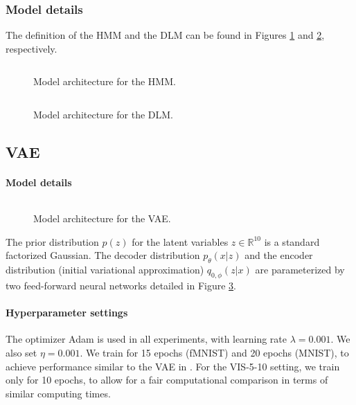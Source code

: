\subsubsection{Model details} The definition of the HMM and the DLM can be found in Figures \ref{fig:hmm} and \ref{fig:dlm}, respectively.

\begin{figure}[!htp]
\centering
{}
\inputminted[fontsize=\scriptsize]{python}{./hmm.tex}
\caption{Model architecture for the HMM.}
\label{fig:hmm}
\end{figure}

\begin{figure}[!htp]
\centering
{}
\inputminted[fontsize=\scriptsize]{python}{./dlm.tex}
\caption{Model architecture for the DLM.}
\label{fig:dlm}
\end{figure}
\fi

\subsection{VAE}

\paragraph{Model details}
\begin{figure}[!htp]
\centering
{}
\inputminted[fontsize=\scriptsize]{python}{./arch_vae.tex}
\caption{Model architecture for the VAE.}
\label{fig:arch_vae}
\end{figure}
The prior distribution $p(z)$ for the latent variables $z \in \mathbb{R}^{10}$ is a standard factorized Gaussian. The decoder distribution $p_\theta(x|z)$ and the encoder distribution (initial variational approximation) $q_{0,\phi}(z|x)$ are parameterized by two feed-forward neural networks 
detailed in Figure \ref{fig:arch_vae}.

\paragraph{Hyperparameter settings}
The optimizer Adam is used in all experiments, with 
learning rate $\lambda=0.001$. We also set $\eta = 0.001$. We train for 15 epochs (fMNIST) and 20 epochs (MNIST), to achieve performance 
similar to the VAE in \cite{pmlr-v89-titsias19a}. For the VIS-5-10 setting, we train only for 10 epochs, to allow for a fair computational comparison in terms of similar computing times.

